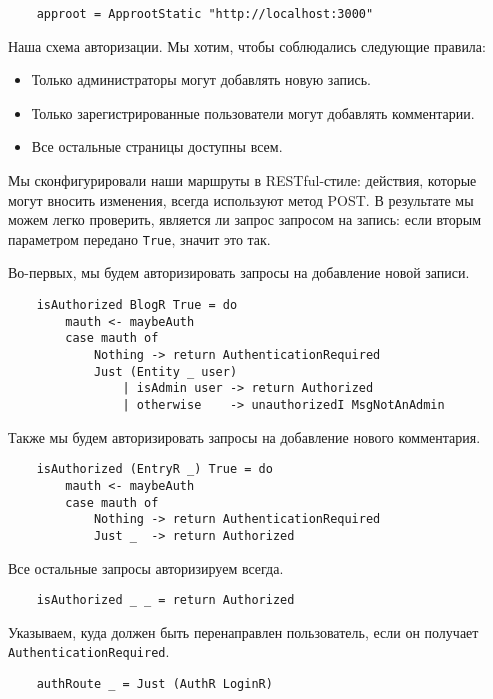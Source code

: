 \begin{lstlisting}
    approot = ApprootStatic "http://localhost:3000"
\end{lstlisting}
 
Наша схема авторизации. Мы хотим, чтобы соблюдались следующие правила:

\begin{itemize}
\item Только администраторы могут добавлять новую запись. 
\item Только зарегистрированные пользователи могут добавлять комментарии. 
\item Все остальные страницы доступны всем.
\end{itemize}

Мы сконфигурировали наши маршруты в RESTful-стиле: действия, которые могут вносить изменения, всегда используют метод POST. В результате мы можем легко проверить, является ли запрос запросом на запись: если вторым параметром передано \lstinline!True!, значит это так.

Во-первых, мы будем авторизировать запросы на добавление новой записи. 
 
\begin{lstlisting}
    isAuthorized BlogR True = do
        mauth <- maybeAuth
        case mauth of
            Nothing -> return AuthenticationRequired
            Just (Entity _ user)
                | isAdmin user -> return Authorized
                | otherwise    -> unauthorizedI MsgNotAnAdmin
\end{lstlisting}

Также мы будем авторизировать запросы на добавление нового комментария. 
 
\begin{lstlisting}
    isAuthorized (EntryR _) True = do
        mauth <- maybeAuth
        case mauth of
            Nothing -> return AuthenticationRequired
            Just _  -> return Authorized
\end{lstlisting}
 
Все остальные запросы авторизируем всегда.
 
\begin{lstlisting}
    isAuthorized _ _ = return Authorized
\end{lstlisting}
 
Указываем, куда должен быть перенаправлен пользователь, если он получает \lstinline!AuthenticationRequired!. 
 
\begin{lstlisting}
    authRoute _ = Just (AuthR LoginR)
\end{lstlisting}
 
